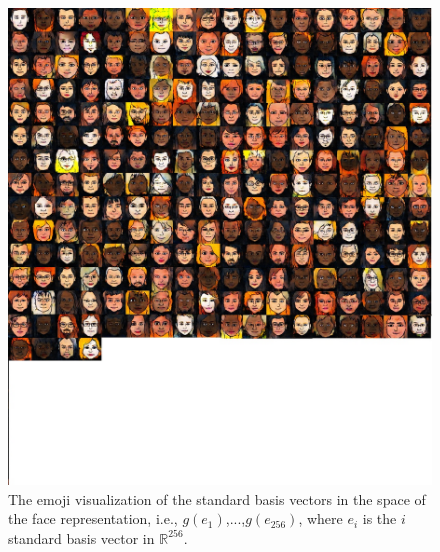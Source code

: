 \documentclass{article} %
\begin{document}
\begin{figure}[H]
\centering
\includegraphics[trim=0 335 0 0, clip, width=.99\linewidth]{e10_wide.jpg}
\caption{\label{fig:e10} The emoji visualization of the standard basis vectors in the space of the face representation, i.e., $g(e_1)$,...,$g(e_{256})$, where $e_i$ is the $i$ standard basis vector in $\mathbb{R}^{256}$.}
\end{figure}
\end{document}
